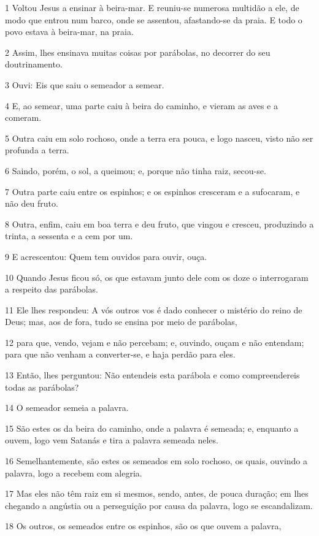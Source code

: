 \par 1 Voltou Jesus a ensinar à beira-mar. E reuniu-se numerosa multidão a ele, de modo que entrou num barco, onde se assentou, afastando-se da praia. E todo o povo estava à beira-mar, na praia.
\par 2 Assim, lhes ensinava muitas coisas por parábolas, no decorrer do seu doutrinamento.
\par 3 Ouvi: Eis que saiu o semeador a semear.
\par 4 E, ao semear, uma parte caiu à beira do caminho, e vieram as aves e a comeram.
\par 5 Outra caiu em solo rochoso, onde a terra era pouca, e logo nasceu, visto não ser profunda a terra.
\par 6 Saindo, porém, o sol, a queimou; e, porque não tinha raiz, secou-se.
\par 7 Outra parte caiu entre os espinhos; e os espinhos cresceram e a sufocaram, e não deu fruto.
\par 8 Outra, enfim, caiu em boa terra e deu fruto, que vingou e cresceu, produzindo a trinta, a sessenta e a cem por um.
\par 9 E acrescentou: Quem tem ouvidos para ouvir, ouça.
\par 10 Quando Jesus ficou só, os que estavam junto dele com os doze o interrogaram a respeito das parábolas.
\par 11 Ele lhes respondeu: A vós outros vos é dado conhecer o mistério do reino de Deus; mas, aos de fora, tudo se ensina por meio de parábolas,
\par 12 para que, vendo, vejam e não percebam; e, ouvindo, ouçam e não entendam; para que não venham a converter-se, e haja perdão para eles.
\par 13 Então, lhes perguntou: Não entendeis esta parábola e como compreendereis todas as parábolas?
\par 14 O semeador semeia a palavra.
\par 15 São estes os da beira do caminho, onde a palavra é semeada; e, enquanto a ouvem, logo vem Satanás e tira a palavra semeada neles.
\par 16 Semelhantemente, são estes os semeados em solo rochoso, os quais, ouvindo a palavra, logo a recebem com alegria.
\par 17 Mas eles não têm raiz em si mesmos, sendo, antes, de pouca duração; em lhes chegando a angústia ou a perseguição por causa da palavra, logo se escandalizam.
\par 18 Os outros, os semeados entre os espinhos, são os que ouvem a palavra,
